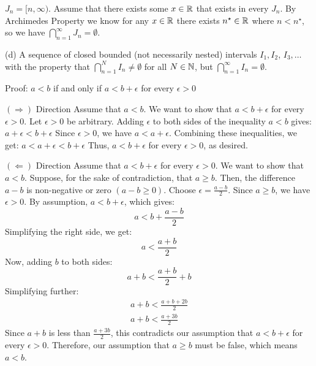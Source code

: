 \documentclass{report}
\begin{document}
$J_n = [n, \infty)$. Assume that there exists some $x \in \RR$ that exists in every $J_n$. By Archimedes Property we know for any $x \in \RR$ there exists $n^\star \in \RR$ where $ n < n^\star$, so we have $\bigcap_{n=1}^{\infty} J_n = \emptyset.$ 

\par \bigskip
(d) A sequence of closed bounded (not necessarily nested) intervals $I_1, I_2$, $I_3, \ldots$ with the property that $\bigcap_{n=1}^N I_n \neq \emptyset$ for all $N \in \NN$, but $\bigcap_{n=1}^{\infty} I_n=\emptyset$.

Proof: $a<b$ if and only if $a<b+\epsilon$ for every $\epsilon>0$
\par
$(\Rightarrow)$ Direction
Assume that $a<b$. We want to show that $a<b+\epsilon$ for every $\epsilon>0$.
Let $\epsilon>0$ be arbitrary. Adding $\epsilon$ to both sides of the inequality $a<b$ gives: $a+\epsilon<b+\epsilon$
Since $\epsilon>0$, we have $a<a+\epsilon$. Combining these inequalities, we get: $a<a+\epsilon<b+\epsilon$
Thus, $a<b+\epsilon$ for every $\epsilon>0$, as desired.

\bigskip
\par
$(\Leftarrow)$ Direction
Assume that $a<b+\epsilon$ for every $\epsilon>0$. We want to show that $a<b$.
Suppose, for the sake of contradiction, that $a \geq b$. Then, the difference $a-b$ is non-negative or zero $(a-b \geq 0)$.
Choose $\epsilon=\frac{a-b}{2}$. Since $a \geq b$, we have $\epsilon>0$. By assumption, $a<b+\epsilon$, which gives:
$$
a<b+\frac{a-b}{2}
$$
Simplifying the right side, we get:
$$
a<\frac{a+b}{2}
$$
Now, adding $b$ to both sides:
$$
a+b<\frac{a+b}{2}+b
$$
Simplifying further:
$$
\begin{gathered}
a+b<\frac{a+b+2 b}{2} \\
a+b<\frac{a+3 b}{2}
\end{gathered}
$$
Since $a+b$ is less than $\frac{a+3 b}{2}$, this contradicts our assumption that $a<b+\epsilon$ for every $\epsilon>0$. Therefore, our assumption that $a \geq b$ must be false, which means $a<b$.
\end{document}
